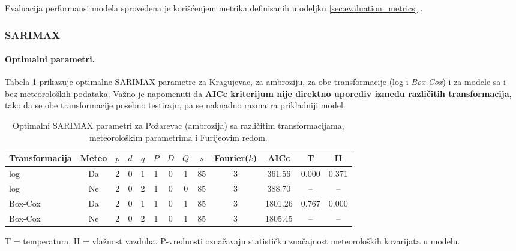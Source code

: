 \documentclass[12pt]{article}
\begin{document}
Evaluacija performansi modela sprovedena je korišćenjem metrika definisanih u odeljku \ref{sec:evaluation_metrics} \cite{brockwell2002, hyndman2018forecasting}.

\subsubsection{SARIMAX}


\paragraph{\textbf{Optimalni parametri.}}  
Tabela \ref{tab:sarimax_params} prikazuje optimalne SARIMAX parametre za Kragujevac, za ambroziju, za obe transformacije (log i \textit{Box-Cox}) i za modele sa i bez meteoroloških podataka.  
Važno je napomenuti da \textbf{AICc kriterijum nije direktno uporediv između različitih transformacija}, tako da se obe transformacije posebno testiraju, pa se naknadno razmatra  prikladniji model.  

\renewcommand{\arraystretch}{1.3}

\begin{table}[h!]
    \label{tab:sarimax_params}
\centering
\caption{Optimalni SARIMAX parametri za Požarevac (ambrozija) sa različitim transformacijama, meteorološkim parametrima i Furijeovim redom.}


\begin{tabular}{|l|c|c|c|c|c|c|c|c|c|c|c|c|}
\hline
\textbf{Transformacija} & \textbf{Meteo} & $p$ & $d$ & $q$ & $P$ & $D$ & $Q$ & $s$ & \textbf{Fourier($k$)} & AICc & \textbf{T} & \textbf{H} \\ \hline
log    & Da & 2 & 0 & 1 & 1 & 0 & 1 & 85 & 3 & 361.56 & 0.000 & 0.371  \\ \hline
log    & Ne & 2 & 0 & 2 & 1 & 0 & 0 & 85 & 3 & 388.70 & -- & -- \\ \hline
Box-Cox & Da & 2 & 0 & 1 & 1 & 0 & 1 & 85 & 3 & 1801.26 & 0.767 & 0.000 \\ \hline
Box-Cox & Ne & 2 & 0 & 2 & 1 & 0 & 1 & 85 & 3 & 1805.45 & -- & -- \\ \hline
\end{tabular}

\vspace{0.2cm}
\footnotesize{T = temperatura, H = vlažnost vazduha. P-vrednosti označavaju statističku značajnost meteoroloških kovarijata u modelu.}
\end{table}
\end{document}
